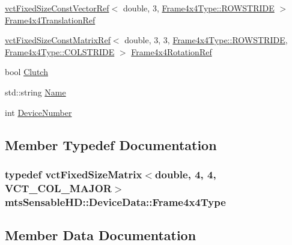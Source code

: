 \begin{DoxyCompactItemize}
\hyperlink{classvct_fixed_size_const_vector_ref}{vct\+Fixed\+Size\+Const\+Vector\+Ref}$<$ double, 3, \hyperlink{classvct_fixed_size_matrix_base_a7ca4cc289d4bd697476f2d37e82e9a38a6c561939f5de9c5e815b889df7662117}{Frame4x4\+Type\+::\+R\+O\+W\+S\+T\+R\+I\+D\+E} $>$ \hyperlink{structmts_sensable_h_d_1_1_device_data_aee2d3dc0deb12ad500c4c57a26106f1b}{Frame4x4\+Translation\+Ref}
\item 
\hyperlink{classvct_fixed_size_const_matrix_ref}{vct\+Fixed\+Size\+Const\+Matrix\+Ref}$<$ double, 3, 3, \hyperlink{classvct_fixed_size_matrix_base_a7ca4cc289d4bd697476f2d37e82e9a38a6c561939f5de9c5e815b889df7662117}{Frame4x4\+Type\+::\+R\+O\+W\+S\+T\+R\+I\+D\+E}, \hyperlink{classvct_fixed_size_matrix_base_a7ca4cc289d4bd697476f2d37e82e9a38a920a67cbcd917bab0e46677bf43cb6b8}{Frame4x4\+Type\+::\+C\+O\+L\+S\+T\+R\+I\+D\+E} $>$ \hyperlink{structmts_sensable_h_d_1_1_device_data_a3d47fe8f2f161326ac01587b7ac74d2c}{Frame4x4\+Rotation\+Ref}
\item 
bool \hyperlink{structmts_sensable_h_d_1_1_device_data_a9f16b01377b10aa6b9961fd55dac7cd7}{Clutch}
\item 
std\+::string \hyperlink{structmts_sensable_h_d_1_1_device_data_aa1b15a9026612af14c0b37cca2deb4f2}{Name}
\item 
int \hyperlink{structmts_sensable_h_d_1_1_device_data_adb16cabaccc5633c5a4676f6372e3211}{Device\+Number}
\end{DoxyCompactItemize}


\subsection{Member Typedef Documentation}
\hypertarget{structmts_sensable_h_d_1_1_device_data_a46ac85be135ad15c04fbe2b06a689781}{}
\subsubsection[{Frame4x4\+Type}]{\setlength{\rightskip}{0pt plus 5cm}typedef {\bf vct\+Fixed\+Size\+Matrix}$<$double, 4, 4, {\bf V\+C\+T\+\_\+\+C\+O\+L\+\_\+\+M\+A\+J\+O\+R}$>$ {\bf mts\+Sensable\+H\+D\+::\+Device\+Data\+::\+Frame4x4\+Type}}\label{structmts_sensable_h_d_1_1_device_data_a46ac85be135ad15c04fbe2b06a689781}


\subsection{Member Data Documentation}
\hypertarget{structmts_sensable_h_d_1_1_device_data_a9d5eb167f38e79ef41f510177b19a292}{}
